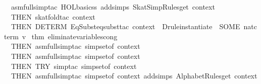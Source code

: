 \begin{isabellebody}
\ \ asm{}full{}simp{}tac\ {}HOL{}basic{}ss\ addsimps\ SkatSimpRules{}get\ context{}\ {}\isanewline
\ \ THEN\ skat{}fold{}tac\ context\ {}\isanewline
\ \ THEN\ DETERM\ {}EqSubst{}eqsubst{}tac\ context\ {}{}{}\ {}Drule{}instantiate{}\ {}{}\ {}SOME\ {}nat{}cterm\ v{}{}\ %
\isaantiq
thm\ eliminate{}variables{}cong{}%
\endisaantiq
{}\ {}{}\isanewline
\ \ THEN\ asm{}full{}simp{}tac\ {}simpset{}of\ context{}\ {}\isanewline
\ \ THEN\ asm{}full{}simp{}tac\ {}simpset{}of\ context{}\ {}\isanewline
\ \ THEN\ TRY\ {}simp{}tac\ {}simpset{}of\ context{}\ {}{}\isanewline
\ \ THEN\ asm{}full{}simp{}tac\ {}simpset{}of\ context\ addsimps\ AlphabetRules{}get\ context{}\ {}\isanewline

\end{isabellebody}
